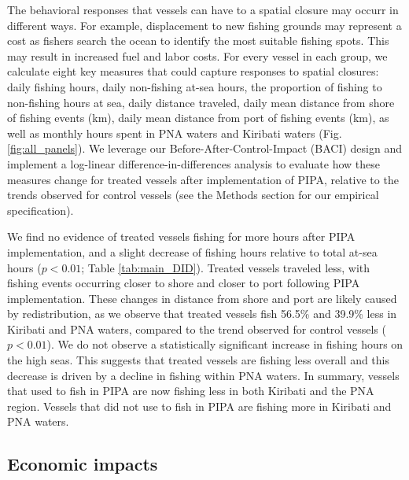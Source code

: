 \documentclass[9p,twocolumn,twoside,lineno]{pnas-new}
\begin{document}
The behavioral responses that vessels can have to a spatial closure may occurr in different ways. For example, displacement to new fishing grounds may represent a cost as fishers search the ocean to identify the most suitable fishing spots. This may result in increased fuel and labor costs. For every vessel in each group, we calculate eight key measures that could capture responses to spatial closures: daily fishing hours, daily non-fishing at-sea hours, the proportion of fishing to non-fishing hours at sea, daily distance traveled, daily mean distance from shore of fishing events (km), daily mean distance from port of fishing events (km), as well as monthly hours spent in PNA waters and Kiribati waters (Fig. \ref{fig:all_panels}). We leverage our Before-After-Control-Impact (BACI) design and implement a log-linear difference-in-differences analysis to evaluate how these measures change for treated vessels after implementation of PIPA, relative to the trends observed for control vessels (see the Methods section for our empirical specification).

We find no evidence of treated vessels fishing for more hours after PIPA implementation, and a slight decrease of fishing hours relative to total at-sea hours ($p < 0.01$; Table \ref{tab:main_DID}). Treated vessels traveled less, with fishing events occurring closer to shore and closer to port following PIPA implementation. These changes in distance from shore and port are likely caused by redistribution, as we observe that treated vessels fish 56.5\% and 39.9\% less in Kiribati and PNA waters, compared to the trend observed for control vessels ($p < 0.01$). We do not observe a statistically significant increase in fishing hours on the high seas. This suggests that treated vessels are fishing less overall and this decrease is driven by a decline in fishing within PNA waters. In summary, vessels that used to fish in PIPA are now fishing less in both Kiribati and the PNA region. Vessels that did not use to fish in PIPA are fishing more in Kiribati and PNA waters.

\subsection{Economic impacts}
\end{document}
